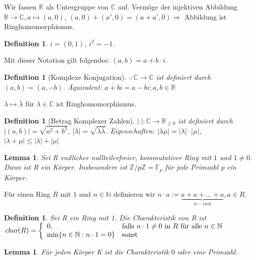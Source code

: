 \documentclass[12pt,a4paper]{article}
\theoremstyle{plain}
\newtheorem{Lemma}[Theorem]{Lemma}
\newtheorem{Definition}[Theorem]{Definition}
\newcommand{\N}{\mathbb{N}}
\newcommand{\R}{\mathbb{R}}
\newcommand{\Z}{\mathbb{Z}}
\newcommand{\C}{\mathbb{C}}
\numberwithin{equation}{section}
\begin{document}
Wir fassen $\R$ als Untergruppe von $\C$ auf. Vermöge der injektiven Abbildung $\R\rightarrow \C, a\mapsto (a,0)$, $(a,0)+(a',0)=(a+a',0) \Rightarrow$ Abbildung ist Ringhomomorphismus.
\begin{Definition}
$i=(0,1)$, $i^2=-1$.
\end{Definition}
Mit dieser Notation gilt folgendes: $(a,b)=a+b\cdot i$.
\begin{Definition}[Komplexe Konjugation]
$\bar{ }:\C\rightarrow \C$ ist definiert durch $\overline{(a,b)}=(a,-b)$. Äquivalent: $\overline{a+b i}=a-b i; a,b\in \R$
\end{Definition}
$\lambda \mapsto \bar{\lambda}$ für $\lambda\in\C$ ist Ringhomomorphismus.
\begin{Definition}[Betrag Komplexer Zahlen]
$|\cdot |:\C\rightarrow \R_{\geq 0}$ ist definiert durch $|(a,b)|=\sqrt{a^2+b^2}$, $|\lambda|=\sqrt{\lambda\bar{\lambda}}$. Eigenschaften: $|\lambda\mu|=|\lambda|\cdot |\mu|$, $|\lambda + \mu|\leq |\lambda|+|\mu|$
\end{Definition}
\begin{Lemma}
Sei R endlicher nullteilerfreier, kommutativer Ring mit $1$ und $1\neq 0$. Dann ist R ein Körper. Insbesondere ist $\Z/p\Z=\mathbb{F}_p$ für jede Primzahl p ein Körper.
\end{Lemma}
Für einen Ring $R$ mit $1$ und $n\in\N$ definieren wir $n\cdot a:=\underbrace{a+a+\ldots+a}_{n-mal}, a\in R$.
\begin{Definition}
Sei R ein Ring mit 1. Die Charakteristik von R ist \\$\emph{char}(R)=\left\lbrace\begin{array}{ll}0,&\text{falls }n\cdot 1\neq 0\text{ in }R\text{ für alle }n\in\N\\
\min\{n\in\N:n\cdot 1=0\}&\text{sonst}
\end{array}\right.$
\end{Definition}
\begin{Lemma}
Für jeden Körper K ist die Charakteristik $0$ oder eine Primzahl.
\end{Lemma}
\end{document}
